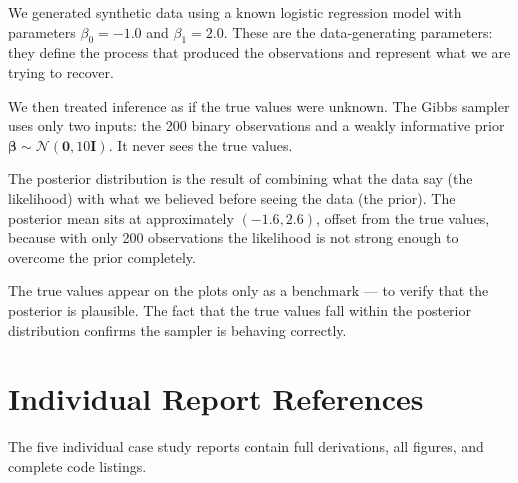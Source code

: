 \documentclass[11pt,a4paper]{article}
\newcommand{\N}{\mathcal{N}}
\begin{document}
\begin{framed}
\noindent
We generated synthetic data using a known logistic regression model with parameters
$\beta_0 = -1.0$ and $\beta_1 = 2.0$.
These are the data-generating parameters: they define the process that produced the
observations and represent what we are trying to recover.

We then treated inference as if the true values were unknown.
The Gibbs sampler uses only two inputs: the 200 binary observations and a weakly
informative prior $\bm{\beta} \sim \N(\bm{0}, 10\bm{I})$.
It never sees the true values.

The posterior distribution is the result of combining what the data say (the likelihood)
with what we believed before seeing the data (the prior).
The posterior mean sits at approximately $(-1.6, 2.6)$, offset from the true values,
because with only 200 observations the likelihood is not strong enough to overcome
the prior completely.

The true values appear on the plots only as a benchmark --- to verify that the posterior
is plausible.
The fact that the true values fall within the posterior distribution confirms the sampler
is behaving correctly.
\end{framed}

\section{Individual Report References}
\label{app:individual-refs}

The five individual case study reports contain full derivations, all figures, and
complete code listings.
\end{document}
